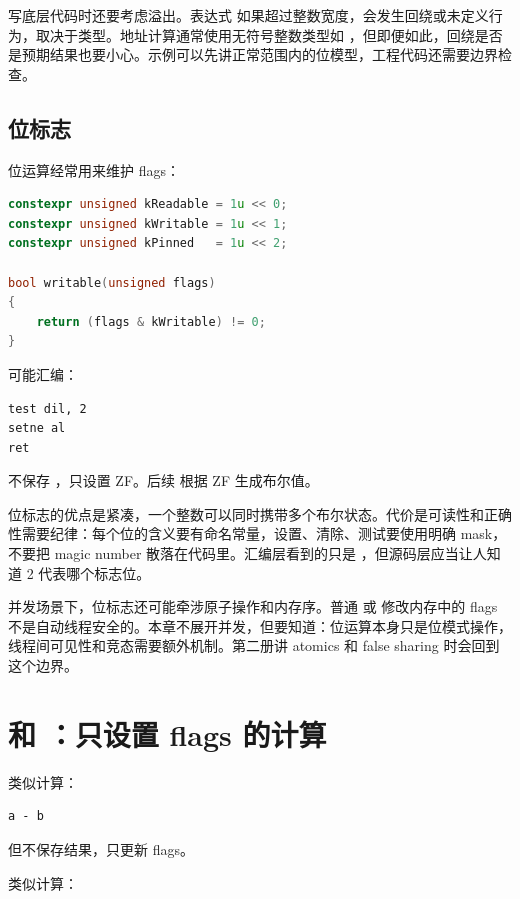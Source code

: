写底层代码时还要考虑溢出。表达式  如果超过整数宽度，会发生回绕或未定义行为，取决于类型。地址计算通常使用无符号整数类型如 ，但即便如此，回绕是否是预期结果也要小心。示例可以先讲正常范围内的位模型，工程代码还需要边界检查。

\subsection{位标志}

位运算经常用来维护 flags：

\begin{lstlisting}[language=C++]
constexpr unsigned kReadable = 1u << 0;
constexpr unsigned kWritable = 1u << 1;
constexpr unsigned kPinned   = 1u << 2;

bool writable(unsigned flags)
{
    return (flags & kWritable) != 0;
}
\end{lstlisting}

可能汇编：

\begin{lstlisting}
test dil, 2
setne al
ret
\end{lstlisting}

 不保存 ，只设置 ZF。后续  根据 ZF 生成布尔值。

位标志的优点是紧凑，一个整数可以同时携带多个布尔状态。代价是可读性和正确性需要纪律：每个位的含义要有命名常量，设置、清除、测试要使用明确 mask，不要把 magic number 散落在代码里。汇编层看到的只是 ，但源码层应当让人知道 2 代表哪个标志位。

并发场景下，位标志还可能牵涉原子操作和内存序。普通  或  修改内存中的 flags 不是自动线程安全的。本章不展开并发，但要知道：位运算本身只是位模式操作，线程间可见性和竞态需要额外机制。第二册讲 atomics 和 false sharing 时会回到这个边界。

\section{ 和 ：只设置 flags 的计算}

 类似计算：

\begin{lstlisting}
a - b
\end{lstlisting}

但不保存结果，只更新 flags。

 类似计算：

